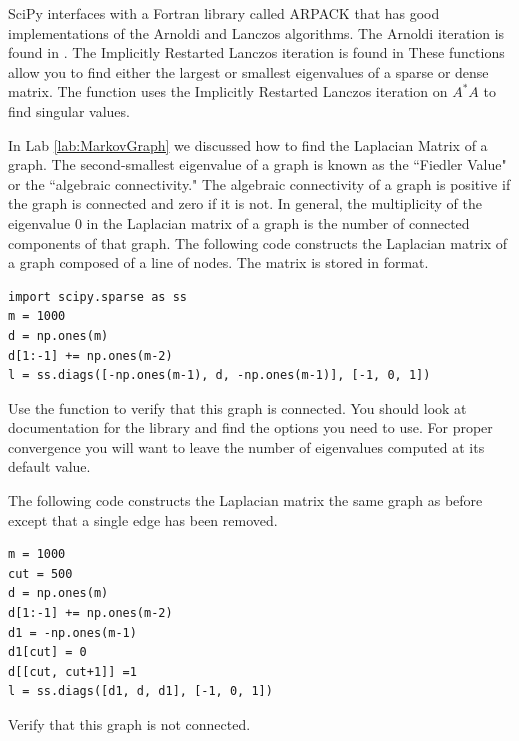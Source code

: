 SciPy interfaces with a Fortran library called ARPACK that has good implementations of the Arnoldi and Lanczos algorithms.
The Arnoldi iteration is found in .
The Implicitly Restarted Lanczos iteration is found in 
These functions allow you to find either the largest or smallest eigenvalues of a sparse or dense matrix.
The function  uses the Implicitly Restarted Lanczos iteration on $A^* A$ to find singular values.

\begin{problem}
In Lab \ref{lab:MarkovGraph} we discussed how to find the Laplacian Matrix of a graph.
The second-smallest eigenvalue of a graph is known as the ``Fiedler Value" or the ``algebraic connectivity."
The algebraic connectivity of a graph is positive if the graph is connected and zero if it is not.
In general, the multiplicity of the eigenvalue $0$ in the Laplacian matrix of a graph is the number of connected components of that graph.
The following code constructs the Laplacian matrix of a graph composed of a line of nodes.
The matrix is stored in  format.
\begin{lstlisting}
import scipy.sparse as ss
m = 1000
d = np.ones(m)
d[1:-1] += np.ones(m-2)
l = ss.diags([-np.ones(m-1), d, -np.ones(m-1)], [-1, 0, 1])
\end{lstlisting}
Use the  function to verify that this graph is connected.
You should look at documentation for the  library and find the options you need to use.
For proper convergence you will want to leave the number of eigenvalues computed at its default value.

The following code constructs the Laplacian matrix the same graph as before except that a single edge has been removed.
\begin{lstlisting}
m = 1000
cut = 500
d = np.ones(m)
d[1:-1] += np.ones(m-2)
d1 = -np.ones(m-1)
d1[cut] = 0
d[[cut, cut+1]] =1
l = ss.diags([d1, d, d1], [-1, 0, 1])
\end{lstlisting}
Verify that this graph is not connected.
\end{problem}